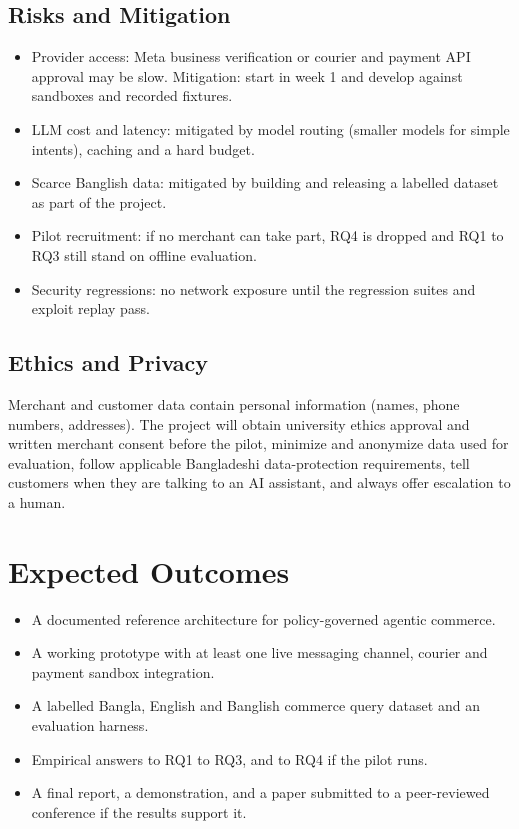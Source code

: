 \documentclass[conference,a4paper]{IEEEtran}
\begin{document}
\subsection{Risks and Mitigation}
\begin{itemize}
\item Provider access: Meta business verification or courier and payment API approval may be slow. Mitigation: start in week 1 and develop against sandboxes and recorded fixtures.
\item LLM cost and latency: mitigated by model routing (smaller models for simple intents), caching and a hard budget.
\item Scarce Banglish data: mitigated by building and releasing a labelled dataset as part of the project.
\item Pilot recruitment: if no merchant can take part, RQ4 is dropped and RQ1 to RQ3 still stand on offline evaluation.
\item Security regressions: no network exposure until the regression suites and exploit replay pass.
\end{itemize}

\subsection{Ethics and Privacy}
Merchant and customer data contain personal information (names, phone numbers, addresses). The project will obtain university ethics approval and written merchant consent before the pilot, minimize and anonymize data used for evaluation, follow applicable Bangladeshi data-protection requirements, tell customers when they are talking to an AI assistant, and always offer escalation to a human.


\section{Expected Outcomes}
\begin{itemize}
\item A documented reference architecture for policy-governed agentic commerce.
\item A working prototype with at least one live messaging channel, courier and payment sandbox integration.
\item A labelled Bangla, English and Banglish commerce query dataset and an evaluation harness.
\item Empirical answers to RQ1 to RQ3, and to RQ4 if the pilot runs.
\item A final report, a demonstration, and a paper submitted to a peer-reviewed conference if the results support it.
\end{itemize}
\end{document}
